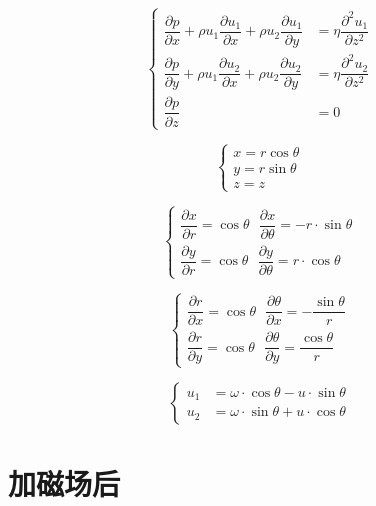 \documentclass[UTF8]{ctexart}
\begin{document}
\begin{equation}
\left \{
\begin{aligned}
\dfrac{\partial p}{\partial x}
+\rho u_1 \dfrac{\partial u_1}{\partial x}
+\rho u_2 \dfrac{\partial u_1}{\partial y}
&= \eta \dfrac{\partial^2 u_1}{\partial z^2} \\
\dfrac{\partial p}{\partial y}
+\rho u_1 \dfrac{\partial u_2}{\partial x}
+\rho u_2 \dfrac{\partial u_2}{\partial y}
&= \eta \dfrac{\partial^2 u_2}{\partial z^2}
\\
 \dfrac{\partial p}{\partial z} &= 0
\end{aligned}
\right.
\end{equation}

\begin{equation}
\left \{
\begin{aligned}
x=r\cos\theta \\
y=r\sin\theta \\
z=z
\end{aligned}
\right.
\end{equation}

\begin{equation}
\left \{
\begin{aligned}
\dfrac{\partial x}{\partial r} = \cos\theta
~~~ \dfrac{\partial x}{\partial \theta}
= -r\cdot \sin\theta \\
\dfrac{\partial y}{\partial r} = \cos\theta
~~~ \dfrac{\partial y}{\partial \theta}
= r\cdot \cos\theta
\end{aligned}
\right.
\end{equation}

\begin{equation}
\left \{
\begin{aligned}
\dfrac{\partial r}{\partial x} = \cos\theta
~~~ \dfrac{\partial \theta}{\partial x}
= -\dfrac{\sin\theta}{r} \\
\dfrac{\partial r}{\partial y} = \cos\theta
~~~ \dfrac{\partial \theta}{\partial y}
= \dfrac{\cos\theta}{r} 
\end{aligned}
\right.
\end{equation}

\begin{equation}
\left \{
\begin{aligned}
u_1 &= \omega\cdot\cos\theta-u\cdot\sin\theta \\
u_2 &= \omega\cdot\sin\theta+u\cdot\cos\theta 
\end{aligned}
\right.
\end{equation}



\section{加磁场后}
\end{document}

